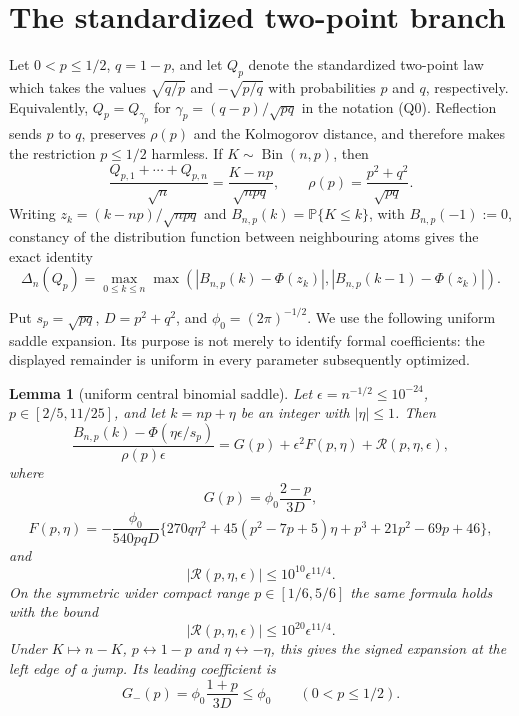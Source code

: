 \documentclass[11pt,a4paper]{article}
\numberwithin{equation}{section}
\newtheorem{lemma}[theorem]{Lemma}
\theoremstyle{definition}
\theoremstyle{remark}
\newcommand{\Pp}{\mathbb P}
\newcommand{\Dn}{\Delta_n}
\begin{document}
\section{The standardized two-point branch}\label{orig:sec:binary}

Let $0<p\le1/2$, $q=1-p$, and let $Q_p$ denote the standardized
two-point law which takes the values $\sqrt{q/p}$ and $-\sqrt{p/q}$ with
probabilities $p$ and $q$, respectively.  Equivalently,
$Q_p=Q_{\gamma_p}$ for $\gamma_p=(q-p)/\sqrt{pq}$ in the notation (Q0).
Reflection sends $p$ to $q$, preserves $\rho(p)$ and the Kolmogorov
distance, and therefore makes the restriction $p\le1/2$ harmless.
If $K\sim\operatorname{Bin}(n,p)$, then
\[
 \frac{Q_{p,1}+\cdots+Q_{p,n}}{\sqrt n}
 =\frac{K-np}{\sqrt{npq}},
 \qquad
 \rho(p)=\frac{p^2+q^2}{\sqrt{pq}}.
\]
Writing $z_k=(k-np)/\sqrt{npq}$ and
$B_{n,p}(k)=\Pp\{K\le k\}$, with $B_{n,p}(-1):=0$, constancy of the distribution function
between neighbouring atoms gives the exact identity
\[
 \Dn(Q_p)=\max_{0\le k\le n}\max\left(
 |B_{n,p}(k)-\Phi(z_k)|,
 |B_{n,p}(k-1)-\Phi(z_k)|\right).
\]

Put $s_p=\sqrt{pq}$, $D=p^2+q^2$, and
$\phi_0=(2\pi)^{-1/2}$.  We use the following uniform saddle expansion.
Its purpose is not merely to identify formal coefficients: the displayed
remainder is uniform in every parameter subsequently optimized.

\begin{lemma}[uniform central binomial saddle]\label{orig:lem:binsaddle}
Let $\epsilon=n^{-1/2}\le10^{-24}$, $p\in[2/5,11/25]$, and let
$k=np+\eta$ be an integer with $|\eta|\le1$.  Then
\begin{equation}\label{orig:eq:edge2}
 \frac{B_{n,p}(k)-\Phi(\eta\epsilon/s_p)}{\rho(p)\epsilon}
 =G(p)+\epsilon^2F(p,\eta)+\mathcal R(p,\eta,\epsilon),
\end{equation}
where
\[
 G(p)=\phi_0\frac{2-p}{3D},
\]
\[
 F(p,\eta)=-\frac{\phi_0}{540pqD}
 \{270q\eta^2+45(p^2-7p+5)\eta
          +p^3+21p^2-69p+46\},
\]
and
\[
 |\mathcal R(p,\eta,\epsilon)|
 \le10^{10}\epsilon^{11/4}.
\]
On the symmetric wider compact range $p\in[1/6,5/6]$ the same formula holds with
the bound
\[
 |\mathcal R(p,\eta,\epsilon)|
 \le10^{20}\epsilon^{11/4}.
\]
Under $K\mapsto n-K$, $p\leftrightarrow1-p$ and
$\eta\leftrightarrow-\eta$, this gives the signed expansion at the left
edge of a jump.  Its leading
coefficient is
\[
 G_-(p)=\phi_0\frac{1+p}{3D}\le\phi_0\qquad(0<p\le1/2).
\]
\end{lemma}
\end{document}
